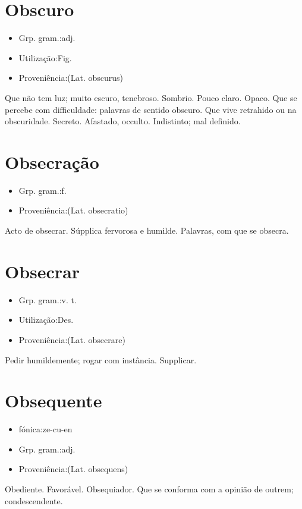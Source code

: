 \section{Obscuro}
\begin{itemize}
\item {Grp. gram.:adj.}
\end{itemize}
\begin{itemize}
\item {Utilização:Fig.}
\end{itemize}
\begin{itemize}
\item {Proveniência:(Lat. \textunderscore obscurus\textunderscore )}
\end{itemize}
Que não tem luz; muito escuro, tenebroso.
Sombrio.
Pouco claro.
Opaco.
Que se percebe com difficuldade: \textunderscore palavras de sentido obscuro\textunderscore .
Que vive retrahido ou na obscuridade.
Secreto.
Afastado, occulto.
Indistinto; mal definido.
\section{Obsecração}
\begin{itemize}
\item {Grp. gram.:f.}
\end{itemize}
\begin{itemize}
\item {Proveniência:(Lat. \textunderscore obsecratio\textunderscore )}
\end{itemize}
Acto de obsecrar.
Súpplica fervorosa e humilde.
Palavras, com que se obsecra.
\section{Obsecrar}
\begin{itemize}
\item {Grp. gram.:v. t.}
\end{itemize}
\begin{itemize}
\item {Utilização:Des.}
\end{itemize}
\begin{itemize}
\item {Proveniência:(Lat. \textunderscore obsecrare\textunderscore )}
\end{itemize}
Pedir humildemente; rogar com instância.
Supplicar.
\section{Obsequente}
\begin{itemize}
\item {fónica:ze-cu-en}
\end{itemize}
\begin{itemize}
\item {Grp. gram.:adj.}
\end{itemize}
\begin{itemize}
\item {Proveniência:(Lat. \textunderscore obsequens\textunderscore )}
\end{itemize}
Obediente.
Favorável.
Obsequiador.
Que se conforma com a opinião de outrem; condescendente.
